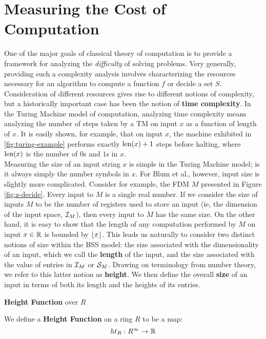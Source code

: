 \section{Measuring the Cost of Computation}
\label{sec:measuring}
One of the major goals of classical theory of computation is to
provide a framework for analyzing the \emph{difficulty} of solving
problems.  Very generally, providing such a complexity analysis
involves characterizing the resources necessary for an algorithm to
compute a function $f$ or decide a set $S$.  Consideration of
different resources gives rise to different notions of complexity, but
a historically important case has been the notion of \textbf{time
  complexity}.  In the Turing Machine model of computation, analyzing
time complexity means analyzing the number of steps taken by a TM on
input $x$ as a function of length of $x$.  It is easily shown, for
example, that on input $x$, the machine exhibited in
\ref{fig:turing-example} performs exactly $\text{len}(x) + 1$ steps before
halting, where $\text{len}(x)$ is the number of $0$s and $1$s in $x$.\\

Measuring the size of an input string $x$ is simple in the Turing
Machine model; is it always simply the number symbols in $x$.  For
Blum et al., however, input size is slightly more complicated.
Consider for example, the FDM $M$ presented in Figure
\ref{fig:z-decide}.  Every input to $M$ is a single real number.  If
we consider the size of inputs $M$ to be the number of registers used
to store an input (ie, the dimension of the input space,
$\mathcal{I}_M$), then every input to $M$ has the same size.  On the
other hand, it is easy to show that the length of any computation
performed by $M$ on input $x \in \mathbb{R}$ is bounded by $\lfloor x \rfloor$.
This leads us naturally to consider two distinct notions of size
within the BSS model: the size associated with the dimensionality of
an input, which we call the \textbf{length} of the input, and the size
associated with the value of entries in $\mathcal{I}_M$ or
$\mathcal{S}_M$.  Drawing on terminology from number theory, we refer
to this latter notion as \textbf{height}.  We then define the overall
\textbf{size} of an input in terms of both its length and the heights
of its entries.

\begin{definition}{\textbf{Height Function} over $R$}

  We define a \textbf{Height Function} on a ring $R$ to be a map:
  $$ht_R:R^\infty \rightarrow \mathbb{R}$$
\end{definition}

